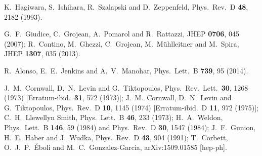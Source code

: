   K.~Hagiwara, S.~Ishihara, R.~Szalapski and D.~Zeppenfeld,
  Phys.\ Rev.\ D {\bf 48}, 2182 (1993).
  
  G.~F.~Giudice, C.~Grojean, A.~Pomarol and R.~Rattazzi,
  JHEP {\bf 0706}, 045 (2007);
  R.~Contino, M.~Ghezzi, C.~Grojean, M.~M\"uhlleitner and M.~Spira,
  JHEP {\bf 1307}, 035 (2013).
  
  R.~Alonso, E.~E.~Jenkins and A.~V.~Manohar,
  Phys.\ Lett.\ B {\bf 739}, 95 (2014).
  
  J.~M.~Cornwall, D.~N.~Levin and G.~Tiktopoulos,
  Phys.\ Rev.\ Lett.\  {\bf 30}, 1268 (1973)
  [Erratum-ibid.\  {\bf 31}, 572 (1973)];
  J.~M.~Cornwall, D.~N.~Levin and G.~Tiktopoulos,
  Phys.\ Rev.\ D {\bf 10}, 1145 (1974)
  [Erratum-ibid.\ D {\bf 11}, 972 (1975)];
  C.~H.~Llewellyn Smith,
  Phys.\ Lett.\ B {\bf 46}, 233 (1973);
  H.~A.~Weldon,
  Phys.\ Lett.\ B {\bf 146}, 59 (1984)
  and
  Phys.\ Rev.\ D {\bf 30}, 1547 (1984);
  J.~F.~Gunion, H.~E.~Haber and J.~Wudka,
  Phys.\ Rev.\ D {\bf 43}, 904 (1991);
  T.~Corbett, O.~J.~P.~\'Eboli and M.~C.~Gonzalez-Garcia,
  arXiv:1509.01585 [hep-ph].

